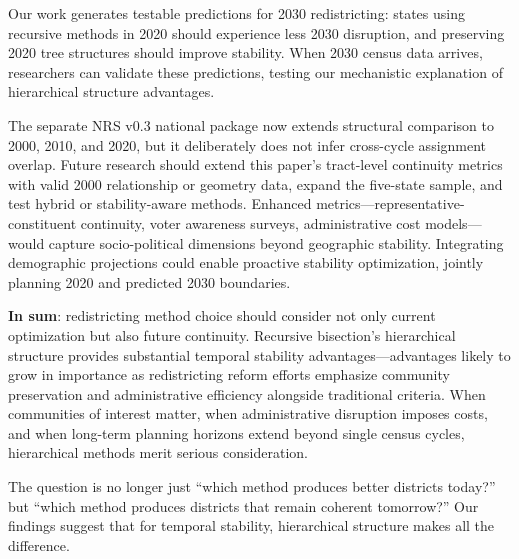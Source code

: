 Our work generates testable predictions for 2030 redistricting: states using recursive methods in 2020 should experience less 2030 disruption, and preserving 2020 tree structures should improve stability. When 2030 census data arrives, researchers can validate these predictions, testing our mechanistic explanation of hierarchical structure advantages.

The separate NRS v0.3 national package now extends structural comparison to
2000, 2010, and 2020, but it deliberately does not infer cross-cycle assignment
overlap. Future research should extend this paper's tract-level continuity
metrics with valid 2000 relationship or geometry data, expand the five-state
sample, and test hybrid or stability-aware methods. Enhanced
metrics—representative-constituent continuity, voter awareness surveys,
administrative cost models—would capture socio-political dimensions beyond
geographic stability. Integrating demographic projections could enable
proactive stability optimization, jointly planning 2020 and predicted 2030
boundaries.

\textbf{In sum}: redistricting method choice should consider not only current optimization but also future continuity. Recursive bisection's hierarchical structure provides substantial temporal stability advantages—advantages likely to grow in importance as redistricting reform efforts emphasize community preservation and administrative efficiency alongside traditional criteria. When communities of interest matter, when administrative disruption imposes costs, and when long-term planning horizons extend beyond single census cycles, hierarchical methods merit serious consideration.

The question is no longer just ``which method produces better districts today?'' but ``which method produces districts that remain coherent tomorrow?'' Our findings suggest that for temporal stability, hierarchical structure makes all the difference.
